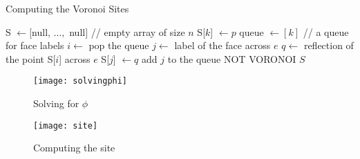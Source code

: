 \documentclass[11pt]{article}
\begin{document}
\begin{algorithm}
\caption{Computing the Voronoi Sites}
\label{alg:voronoisites}
    \begin{algorithmic}[1]
        \State S $\gets [$null, $\ldots, $ null$]$ // empty array of size $n$
        \State S[$k$] $\gets p$
        \State queue $\gets [ k ]$  // a queue for face labels
            \State $i \gets$ pop the queue
                \State $j \gets $ label of the face across $e$
                \State $q \gets $ reflection of the point S[$i$] across $e$
                    \State S[$j$] $\gets q$
                    \State add $j$ to the queue
                    \State \Return NOT VORONOI
                \EndIf
            \EndFor
        \EndWhile
        \State \Return $S$
    \EndFunction
    \end{algorithmic}
\end{algorithm}

\begin{figure}[h]
    \centering
    \texttt{[image: solvingphi]}
    \label{fig:solvingphi}
    \caption{Solving for $\phi$}
\end{figure}

\begin{figure}[h]
    \centering
    \texttt{[image: site]}
    \label{fig:site}
    \caption{Computing the site}
\end{figure}
\end{document}
